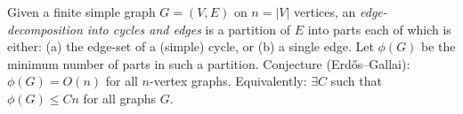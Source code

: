 Given a finite simple graph $G=(V,E)$ on $n=|V|$ vertices, an \emph{edge-decomposition into cycles and edges} is a partition of $E$
into parts each of which is either:
(a) the edge-set of a (simple) cycle, or (b) a single edge.
Let $\phi(G)$ be the minimum number of parts in such a partition.
Conjecture (Erd\H{o}s--Gallai): $\phi(G)=O(n)$ for all $n$-vertex graphs.
Equivalently: $\exists C$ such that $\phi(G)\le Cn$ for all graphs $G$.
